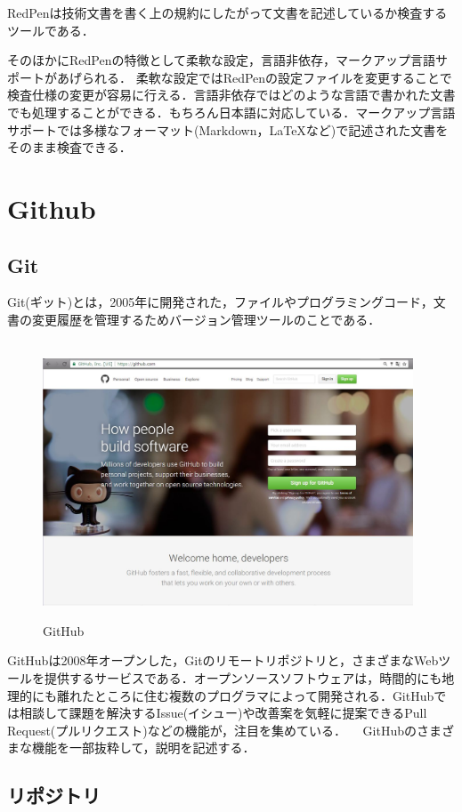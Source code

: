 RedPenは技術文書を書く上の規約にしたがって文書を記述しているか検査するツールである．

そのほかにRedPenの特徴として柔軟な設定，言語非依存，マークアップ言語サポートがあげられる．
柔軟な設定ではRedPenの設定ファイルを変更することで検査仕様の変更が容易に行える．言語非依存ではどのような言語で書かれた文書でも処理することができる．もちろん日本語に対応している．マークアップ言語サポートでは多様なフォーマット(Markdown，LaTeXなど)で記述された文書をそのまま検査できる\cite{1}．


\newpage
\section{Github}
\subsection{Git}
Git(ギット)とは，2005年に開発された，ファイルやプログラミングコード，文書の変更履歴を管理するためバージョン管理ツールのことである．

\begin{figure}[htb]
\centering　
\includegraphics[width=11cm]{29.JPG}
\caption{GitHub}\label{tab:uac}
\end{figure}
GitHubは2008年オープンした，Gitのリモートリポジトリと，さまざまなWebツールを提供するサービスである．オープンソースソフトウェアは，時間的にも地理的にも離れたところに住む複数のプログラマによって開発される．GitHubでは相談して課題を解決するIssue(イシュー)や改善案を気軽に提案できるPull Request(プルリクエスト)などの機能が，注目を集めている．\cite{2}
　GitHubのさまざまな機能を一部抜粋して，説明を記述する．



\subsection{リポジトリ}

